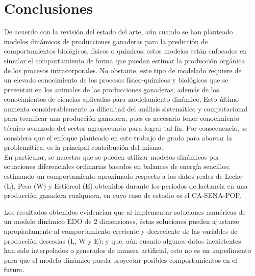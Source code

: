 \section{Conclusiones}

De acuerdo con la revisión del estado del arte, aún cuando se han planteado modelos dinámicos de producciones ganaderas para la predicción de comportamientos biológicos, físicos o químicos; estos modelos están enfocados en simular el comportamiento de forma que puedan estimar la producción orgánica de los procesos intracorporales. No obstante, este tipo de modelado requiere de un elevado conocimiento de los procesos físico-químicos y biológicos que se presentan en los animales de las producciones ganaderas, además de los conocimientos de ciencias aplicadas para modelamiento dinámico. Esto último aumenta considerablemente la dificultad del análisis sistemático y computacional para tecnificar una producción ganadera, pues es necesario tener conocimiento técnico avanzado del sector agropecuario para lograr tal fin. Por consecuencia, se considera que el enfoque planteado en este trabajo de grado para abarcar la problemática, es la principal contribución del mismo.\\ 

En particular, se muestra que se pueden utilizar modelos dinámicos por ecuaciones diferenciales ordinarias basados en balances de energía sencillos; estimando un comportamiento aproximado  respecto a los datos reales de Leche (L), Peso (W) y Estiércol (E) obtenidos durante los periodos de lactancia en una producción ganadera cualquiera, en cuyo caso de estudio es el CA-SENA-POP.

Los resultados obtenidos evidencian que al implementar soluciones numéricas de un modelo dinámico EDO de 2 dimensiones, éstas soluciones pueden ajustarse apropiadamente al comportamiento creciente y decreciente de las variables de producción deseadas (L, W y E); y que, aún cuando algunos datos inexistentes han sido interpolados o generados de manera artificial, esto no es un impedimento para que el modelo dinámico pueda proyectar posibles comportamientos en el futuro.\\

